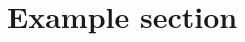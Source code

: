 \documentclass{elsarticle}
\begin{document}
	\section{Example section}
	\lipsum[3-5]
\end{document}
